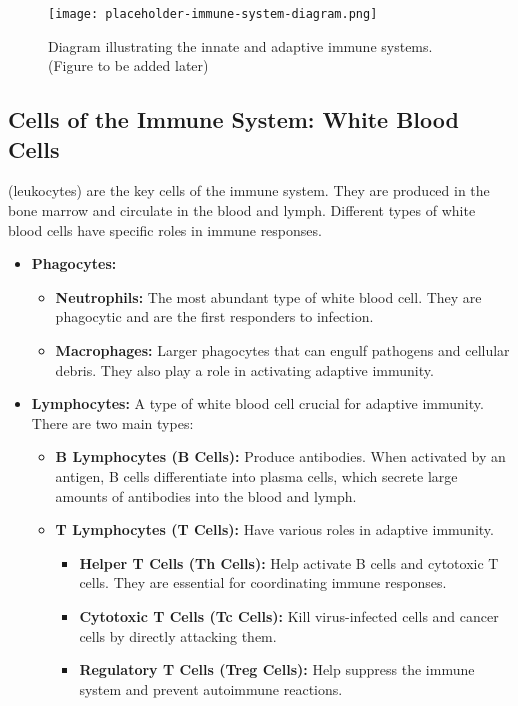 \begin{figure}[htbp]
    \centering
    \texttt{[image: placeholder-immune-system-diagram.png]}
    \caption{Diagram illustrating the innate and adaptive immune systems. (Figure to be added later)}
    \label{fig:immunesystem}
\end{figure}

\subsection{Cells of the Immune System: White Blood Cells}

 (leukocytes) are the key cells of the immune system.  They are produced in the bone marrow and circulate in the blood and lymph.  Different types of white blood cells have specific roles in immune responses.

\begin{itemize}
    \item \textbf{Phagocytes:}
        \begin{itemize}
            \item \textbf{Neutrophils:}  The most abundant type of white blood cell.  They are phagocytic and are the first responders to infection.
            \item \textbf{Macrophages:}  Larger phagocytes that can engulf pathogens and cellular debris. They also play a role in activating adaptive immunity.
        \end{itemize}
    \item \textbf{Lymphocytes:}  A type of white blood cell crucial for adaptive immunity.  There are two main types:
        \begin{itemize}
            \item \textbf{B Lymphocytes (B Cells):}  Produce antibodies.  When activated by an antigen, B cells differentiate into plasma cells, which secrete large amounts of antibodies into the blood and lymph.
            \item \textbf{T Lymphocytes (T Cells):}  Have various roles in adaptive immunity.
                \begin{itemize}
                    \item \textbf{Helper T Cells (Th Cells):}  Help activate B cells and cytotoxic T cells. They are essential for coordinating immune responses.
                    \item \textbf{Cytotoxic T Cells (Tc Cells):}  Kill virus-infected cells and cancer cells by directly attacking them.
                    \item \textbf{Regulatory T Cells (Treg Cells):}  Help suppress the immune system and prevent autoimmune reactions.
                \end{itemize}
        \end{itemize}
\end{itemize}

